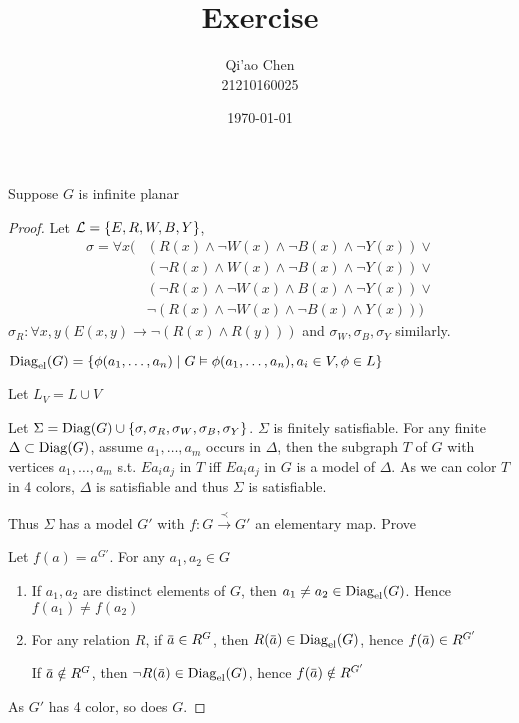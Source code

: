 \documentclass[11pt]{article}
\author{Qi'ao Chen\\21210160025}
\date{\today}
\title{Exercise}
\begin{document}
\maketitle
\begin{exercise}
Suppose \(G\) is infinite planar
\end{exercise}

\begin{proof}
Let \(\mathcal{L}=\{E,R,W,B,Y\}\),
\begin{align*}
\sigma=\forall x(&(R(x)\wedge\neg W(x)\wedge\neg B(x)\wedge\neg Y(x))\vee\\
&(\neg R(x)\wedge W(x)\wedge\neg B(x)\wedge\neg Y(x))\vee\\
&(\neg R(x)\wedge\neg W(x)\wedge B(x)\wedge\neg Y(x))\vee\\
&\neg (R(x)\wedge\neg W(x)\wedge\neg B(x)\wedge Y(x)))
\end{align*}
\(\sigma_R:\forall x,y(E(x,y)\to\neg (R(x)\wedge R(y)))\) and \(\sigma_W,\sigma_B,\sigma_Y\) similarly.

\(\operatorname{Diag}_{\operatorname{el}}(G)=\{\phi(a_1,\dots,a_n)\mid G\vDash\phi(a_1,\dots,a_n),a_i\in V,\phi\in L\}\)

Let \(L_V=L\cup V\)

Let \(\Sigma=\operatorname{Diag}(G)\cup\{\sigma,\sigma_R,\sigma_W,\sigma_B,\sigma_Y\}\). \(\Sigma\) is finitely satisfiable. For any finite \(\Delta\subset\operatorname{Diag}(G)\),
assume \(a_1,\dots,a_m\) occurs in \(\Delta\), then the subgraph \(T\) of \(G\) with vertices \(a_1,\dots,a_m\)
s.t. \(Ea_ia_j\) in \(T\) iff \(Ea_ia_j\) in \(G\)
is a
model of \(\Delta\). As we can color \(T\) in 4 colors, \(\Delta\) is satisfiable and thus \(\Sigma\) is satisfiable.

Thus \(\Sigma\) has a model \(G'\) with \(f:G\xrightarrow{\prec}G'\) an elementary map. Prove

Let \(f(a)=a^{G'}\). For any \(a_1,a_2\in G\)
\begin{enumerate}
\item If \(a_1,a_2\) are distinct elements of \(G\), then \(a_1\neq a_2\in\operatorname{Diag}_{\operatorname{el}}(G)\). Hence \(f(a_1)\neq f(a_2)\)
\item For any relation \(R\), if \(\bara\in R^G\), then \(R(\bara)\in\Diag_{\el}(G)\),
hence \(f(\bara)\in R^{G'}\)

If \(\bara\notin R^G\), then \(\neg R(\bara)\in\Diag_{\el}(G)\), hence \(f(\bara)\notin R^{G'}\)
\end{enumerate}

As \(G'\) has 4 color, so does \(G\).
\end{proof}
\end{document}
